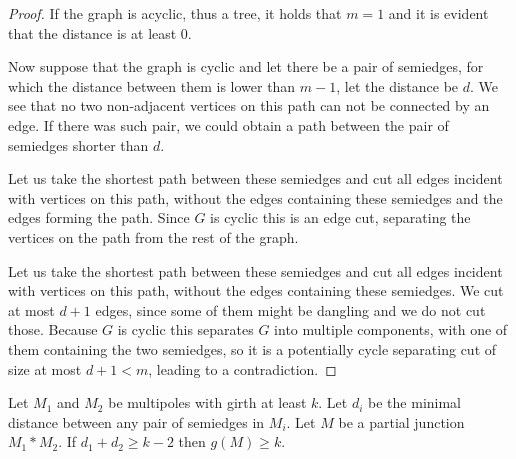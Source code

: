 \documentclass[12pt, twoside]{book}
\begin{document}
\begin{proof}
	If the graph is acyclic, thus a tree, it holds that $m=1$ and it is evident that the distance is at least 0.
	
	Now suppose that the graph is cyclic and let there be a pair of semiedges, for which the distance between them is lower than $m-1$, let the distance be $d$. We see that no two non-adjacent vertices on this path can not be connected by an edge. If there was such pair, we could obtain a path between the pair of semiedges shorter than $d$.
	
	Let us take the shortest path between these semiedges and cut all edges incident with vertices on this path, without the edges containing these semiedges and the edges forming the path. Since $G$ is cyclic this is an edge cut, separating the vertices on the path from the rest of the graph.
	
	
	
	
	
	
	
	 Let us take the shortest path between these semiedges and cut all edges incident with vertices on this path, without  the edges containing these semiedges. We cut at most $d+1$ edges, since some of them might be dangling and we do not cut those. Because $G$ is cyclic this separates $G$ into multiple components, with one of them containing the two semiedges, so it is a potentially cycle separating cut of size at most $d+1<m$, leading to a contradiction. 
\end{proof}

\begin{lemma}\label{lem:cyclic-multipoles-with-girth-and-distance}
	Let $M_1$ and $M_2$ be multipoles with girth at least $k$. Let $d_i$ be the minimal distance between any pair of semiedges in $M_i$. Let $M$ be a partial junction $M_1*M_2$. If $d_1+d_2\geq k-2$ then $g(M)\geq k$.
\end{lemma}
\end{document}
